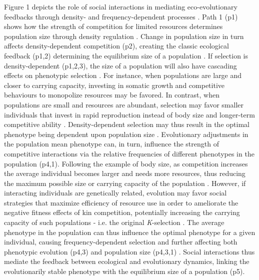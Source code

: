 \documentclass{article}
\begin{document}
 Figure 1 depicts the role of social interactions in mediating eco-evolutionary feedbacks through density- and frequency-dependent processes \citep{Engen2020}. Path 1 (p1) shows how the strength of competition for limited resources determines population size through density regulation \citep{Gilpin1973a}. Change in population size in turn affects density-dependent competition (p2), creating the classic ecological feedback (p1,2) determining the equilibrium size of a population \citep{Travis2013}. If selection is density-dependent (p1,2,3), the size of a population will also have cascading effects on phenotypic selection  \citep{Mueller1997, Boyce1984}. For instance, when populations are large and closer to carrying capacity, investing in somatic growth and competitive behaviours to monopolize resources may be favored. In contrast, when populations are small and resources are abundant, selection may favor smaller individuals that invest in rapid reproduction instead of body size and longer-term competitive ability \citep{Joshi2001, Wright2018, Engen2017}. Density-dependent selection may thus result in the optimal phenotype being dependent upon population size \citep{Anderson1971, Charlesworth1971}. Evolutionary adjustments in the population mean phenotype can, in turn, influence the strength of competitive interactions via the relative frequencies of different phenotypes in the population \citep{Wright1969} (p4,1). Following the example of body size, as competition increases the average individual becomes larger and needs more resources, thus reducing the maximum possible size or carrying capacity of the population \citep{Engen2020}. However, if interacting individuals are genetically related, evolution may favor social strategies that maximize efficiency of resource use in order to ameliorate the negative fitness effects of kin competition, potentially increasing the carrying capacity of such populations - i.e. the original \textit{K}-selection \citep{macarthur1967theory,  Boyce1984, Engen2013}. The average phenotype in the population can thus influence the optimal phenotype for a given individual, causing frequency-dependent selection and further affecting both phenotypic evolution (p4,3) \citep{Heino1998} and population size (p4,3,1) \citep{Svensson2018}. Social interactions thus mediate the feedback between ecological and evolutionary dynamics, linking the evolutionarily stable phenotype with the equilibrium size of a population (p5).
\end{document}
